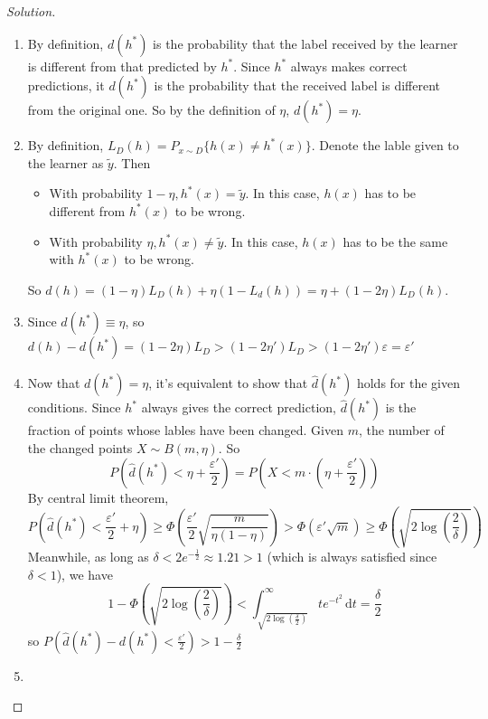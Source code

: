 \documentclass[12pt,letterpaper]{article}
\newenvironment{solution}{%
  \begin{proof}[Solution]$ $\par\nobreak\ignorespaces
}{%
  \end{proof}
}
\newcommand{\dd}{\,\mathrm{d}}
\begin{document}
\begin{enumerate}
\begin{solution}
\begin{enumerate}[label=(\alph*)]
\item   By definition, $d(h^{*})$ is the probability that the label received by the learner is different from that predicted by $h^{*}$. Since $h^{*}$ always makes correct predictions, it $d(h^{*})$ is the probability that the received label is different from the original one. So by the definition of $\eta$, $d(h^{*})=\eta$.
\item By definition, $L_{D}(h)=P_{x\sim D}\{h(x)\neq h^{*}(x)\}$. Denote the lable given to the learner as $\tilde y$. Then
\begin{itemize}
\item With probability $1-\eta, h^{*}(x)=\tilde y$. In this case, $h(x)$ has to be different from $h^{*}(x)$ to be wrong.
\item With probability $\eta, h^{*}(x)\neq\tilde y$. In this case, $h(x)$ has to be the same with $h^{*}(x)$ to be wrong.
\end{itemize}
So $d(h)=(1-\eta)L_{D}(h)+\eta(1-L_{d}(h))=\eta+(1-2\eta)L_{D}(h)$.
\item Since $d(h^{*})\equiv \eta$, so $d(h)-d(h^{*})=(1-2\eta)L_{D}> (1-2\eta')L_{D}>(1-2\eta')\varepsilon=\varepsilon'$
\item Now that $d(h^{*})=\eta$, it's equivalent to show that $\hat d(h^{*})$ holds for the given conditions. Since $h^{*}$ always gives the correct prediction, $\hat d(h^{*})$ is the fraction of points whose lables have been changed. Given $m$, the number of the changed points $X\sim B(m,\eta)$. So
  \[P(\hat d(h^{*})<\eta+\frac{\varepsilon'}{2})=P(X<m\cdot(\eta+\frac{\varepsilon'}{2}))\]
  By central limit theorem,
  \[P(\hat d(h^{*})<\frac{\varepsilon'}{2}+\eta)\geq \Phi(\frac{\varepsilon'}{2}\sqrt{\frac{m}{\eta(1-\eta)}})>\Phi(\varepsilon'\sqrt{m})\geq\Phi(\sqrt{2\log(\frac{2}{\delta})})\]
  Meanwhile, as long as $\delta<2e^{-\frac{1}{2}}\approx 1.21>1$ (which is always satisfied since $\delta<1$), we have
  \[1-\Phi(\sqrt{2\log(\frac{2}{\delta})})<\int_{\sqrt{2\log(\frac{\delta}{2})}}^{\infty}te^{-t^{2}}\dd t=\frac{\delta}{2}\]
  so $P(\hat d(h^{*})-d(h^{*})<\frac{\varepsilon'}{2})>1-\frac{\delta}{2}$
\item %

\end{enumerate}
\end{solution}
\end{enumerate}
\end{document}
